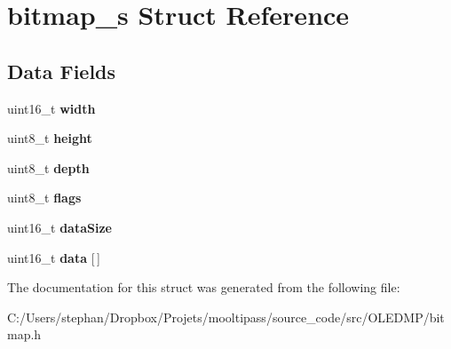 \hypertarget{structbitmap__s}{\section{bitmap\-\_\-s Struct Reference}
\label{structbitmap__s}
}
\subsection*{Data Fields}
\begin{DoxyCompactItemize}
\item 
\hypertarget{structbitmap__s_ad0eab1042455a2067c812ab8071d5376}{uint16\-\_\-t {\bfseries width}}\label{structbitmap__s_ad0eab1042455a2067c812ab8071d5376}

\item 
\hypertarget{structbitmap__s_adcf201a8aabf55cb352ec05331242594}{uint8\-\_\-t {\bfseries height}}\label{structbitmap__s_adcf201a8aabf55cb352ec05331242594}

\item 
\hypertarget{structbitmap__s_ab6f276082172be43a6041212071e377b}{uint8\-\_\-t {\bfseries depth}}\label{structbitmap__s_ab6f276082172be43a6041212071e377b}

\item 
\hypertarget{structbitmap__s_aa2585d779da0ab21273a8d92de9a0ebe}{uint8\-\_\-t {\bfseries flags}}\label{structbitmap__s_aa2585d779da0ab21273a8d92de9a0ebe}

\item 
\hypertarget{structbitmap__s_afe5dbe9ff0f4a3d528fdd0697ad730eb}{uint16\-\_\-t {\bfseries data\-Size}}\label{structbitmap__s_afe5dbe9ff0f4a3d528fdd0697ad730eb}

\item 
\hypertarget{structbitmap__s_a150379680c51ad51c2ffc0c53c051d9f}{uint16\-\_\-t {\bfseries data} \mbox{[}$\,$\mbox{]}}\label{structbitmap__s_a150379680c51ad51c2ffc0c53c051d9f}

\end{DoxyCompactItemize}


The documentation for this struct was generated from the following file\-:\begin{DoxyCompactItemize}
\item 
C\-:/\-Users/stephan/\-Dropbox/\-Projets/mooltipass/source\-\_\-code/src/\-O\-L\-E\-D\-M\-P/bitmap.\-h\end{DoxyCompactItemize}
